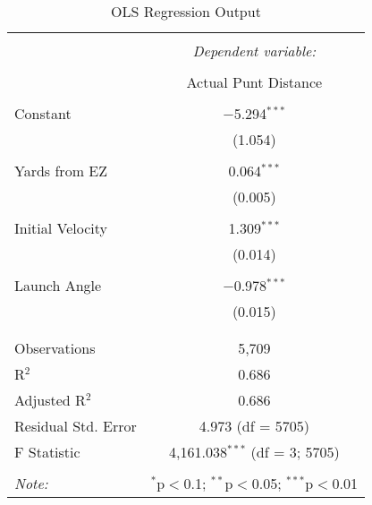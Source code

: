 
\begin{table}[!htbp] \centering 
  \caption{OLS Regression Output} 
  \label{} 
\begin{tabular}{@{\extracolsep{5pt}}lc} 
\\[-1.8ex]\hline 
\hline \\[-1.8ex] 
 & \multicolumn{1}{c}{\textit{Dependent variable:}} \\ 
\cline{2-2} 
\\[-1.8ex] & Actual Punt Distance \\ 
\hline \\[-1.8ex] 
 Constant & $-$5.294$^{***}$ \\ 
  & (1.054) \\ 
  & \\ 
 Yards from EZ & 0.064$^{***}$ \\ 
  & (0.005) \\ 
  & \\ 
 Initial Velocity & 1.309$^{***}$ \\ 
  & (0.014) \\ 
  & \\ 
 Launch Angle & $-$0.978$^{***}$ \\ 
  & (0.015) \\ 
  & \\ 
\hline \\[-1.8ex] 
Observations & 5,709 \\ 
R$^{2}$ & 0.686 \\ 
Adjusted R$^{2}$ & 0.686 \\ 
Residual Std. Error & 4.973 (df = 5705) \\ 
F Statistic & 4,161.038$^{***}$ (df = 3; 5705) \\ 
\hline 
\hline \\[-1.8ex] 
\textit{Note:}  & \multicolumn{1}{r}{$^{*}$p$<$0.1; $^{**}$p$<$0.05; $^{***}$p$<$0.01} \\ 
\end{tabular} 
\end{table} 
